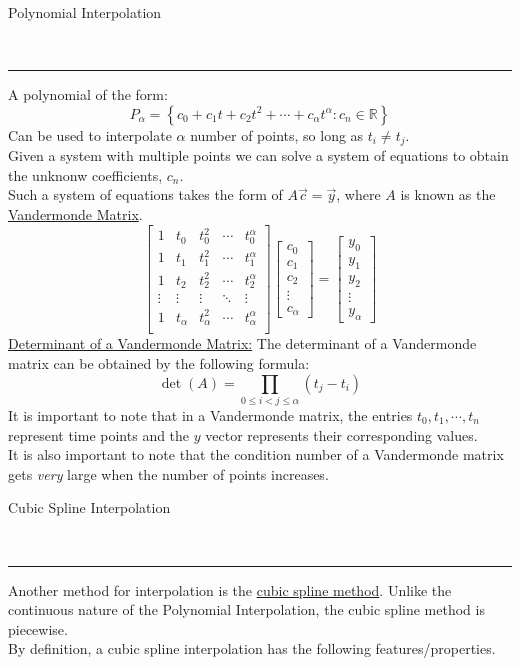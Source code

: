\documentclass{article}
\newcommand{\header}[1]{\begin{large}\noindent #1\end{large}\\\rule{\textwidth}{0.5pt}}
\newcommand{\gap}{\medskip\\}
\begin{document}
\header{Polynomial Interpolation}
A polynomial of the form:
\[
    P_\alpha = \left\{ c_0 + c_1t + c_2t^2 + \cdots + c_\alpha t^\alpha : c_n \in \mathbb{R}\right\}  
\]
Can be used to interpolate $\alpha$ number of points, so long as $t_i \neq t_j$.
\gap
Given a system with multiple points we can solve a system of equations to obtain the 
unknonw coefficients, $c_n$.
\gap
Such a system of equations takes the form of $A\vec{c} = \vec{y}$, where $A$ is
known as the \underline{Vandermonde Matrix}.
\[
    \begin{bmatrix}
        1 & t_0 & t_0^2 & \cdots & t_0^\alpha\\
        1 & t_1 & t_1^2 & \cdots & t_1^\alpha\\
        1 & t_2 & t_2^2 & \cdots & t_2^\alpha\\
        \vdots & \vdots & \vdots & \ddots & \vdots\\
        1 & t_\alpha & t_\alpha^2 & \cdots & t_\alpha^\alpha\\
    \end{bmatrix}  
    \begin{bmatrix}
        c_0\\
        c_1\\
        c_2\\
        \vdots\\
        c_\alpha
    \end{bmatrix}
    =
    \begin{bmatrix}
        y_0\\
        y_1\\
        y_2\\
        \vdots\\
        y_\alpha
    \end{bmatrix}
\]
\underline{Determinant of a Vandermonde Matrix:} The determinant of a Vandermonde matrix
can be obtained by the following formula:
\[
    \det(A) = \prod_{0 \leq i < j \leq \alpha}(t_j - t_i)    
\]
It is important to note that in a Vandermonde matrix, the entries $t_0, t_1, \cdots, t_n$
represent time points and the $y$ vector represents their corresponding values.
\gap
It is also important to note that the condition number of a Vandermonde matrix gets
\textit{very} large when the number of points increases.
\gap
\header{Cubic Spline Interpolation}
Another method for interpolation is the \underline{cubic spline method}. Unlike the
continuous nature of the Polynomial Interpolation, the cubic spline method is 
piecewise.
\gap
By definition, a cubic spline interpolation has the following features/properties.
\end{document}
